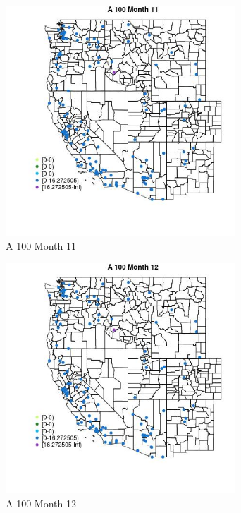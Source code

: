 \begin{figure} 
\centering  
\includegraphics[width=0.77\textwidth]{Code_Outputs/Report_ML_input_PM25_Step4_part_e_de_duplicated_aves_MapObsMo11A_100.jpg} 
\caption{\label{fig:Report_ML_input_PM25_Step4_part_e_de_duplicated_avesMapObsMo11A_100}A 100 Month 11} 
\end{figure} 
 

\begin{figure} 
\centering  
\includegraphics[width=0.77\textwidth]{Code_Outputs/Report_ML_input_PM25_Step4_part_e_de_duplicated_aves_MapObsMo12A_100.jpg} 
\caption{\label{fig:Report_ML_input_PM25_Step4_part_e_de_duplicated_avesMapObsMo12A_100}A 100 Month 12} 
\end{figure} 
 

